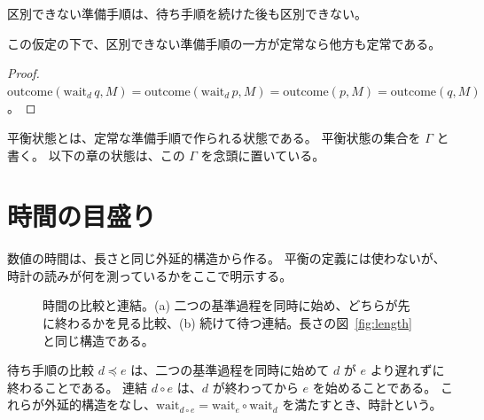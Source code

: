 \begin{empirical}[状態が以後の変化を決める]
  \label{emp:state-determines}
  \leanok
  区別できない準備手順は、待ち手順を続けた後も区別できない。
\end{empirical}

\begin{theorem}[定常性は状態の性質になる]
  \label{thm:stationary-congr}
  \leanok
  この仮定の下で、区別できない準備手順の一方が定常なら他方も定常である。
\end{theorem}

\begin{proof}
  \leanok
  $\mathrm{outcome}(\mathrm{wait}_d\, q, M) = \mathrm{outcome}(\mathrm{wait}_d\, p, M) = \mathrm{outcome}(p, M) = \mathrm{outcome}(q, M)$。
\end{proof}

\begin{definition}[平衡状態]
  \label{def:equilibrium}
  \leanok
  平衡状態とは、定常な準備手順で作られる状態である。
  平衡状態の集合を $\Gamma$ と書く。
  以下の章の状態は、この $\Gamma$ を念頭に置いている。
\end{definition}

\section{時間の目盛り}

数値の時間は、長さと同じ外延的構造から作る。
平衡の定義には使わないが、時計の読みが何を測っているかをここで明示する。

\begin{figure}[htbp]
  \centering
  \caption{時間の比較と連結。(a) 二つの基準過程を同時に始め、どちらが先に終わるかを見る比較、(b) 続けて待つ連結。長さの図~\ref{fig:length} と同じ構造である。}
  \label{fig:clock}
\end{figure}

\begin{definition}[時計]
  \label{def:clock}
  \leanok
  待ち手順の比較 $d \preceq e$ は、二つの基準過程を同時に始めて $d$ が $e$ より遅れずに終わることである。
  連結 $d \circ e$ は、$d$ が終わってから $e$ を始めることである。
  これらが外延的構造をなし、$\mathrm{wait}_{d \circ e} = \mathrm{wait}_e \circ \mathrm{wait}_d$ を満たすとき、時計という。
\end{definition}

